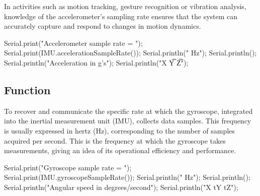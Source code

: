 In activities such as motion tracking, gesture recognition or vibration analysis, knowledge of the accelerometer's sampling rate ensures that the system can accurately capture and respond to changes in motion dynamics. 

\begin{Arduino}
	Serial.print("Accelerometer sample rate = ");
	Serial.print(IMU.accelerationSampleRate());
	Serial.println(" Hz");
	Serial.println();
	Serial.println("Acceleration in g's");
	Serial.println("X \t Y  \t Z");
\end{Arduino}



\subsection{Function }

To recover and communicate the specific rate at which the gyroscope, integrated into the inertial measurement unit (IMU), collects data samples. This frequency is usually expressed in hertz (Hz), corresponding to the number of samples acquired per second. This is the frequency at which the gyroscope takes measurements, giving an idea of its operational efficiency and performance. \cite{STMicroelectronics_LSM9DS1:2024}

\begin{Arduino}
	Serial.print("Gyroscope sample rate = ");
	Serial.print(IMU.gyroscopeSampleRate());
	Serial.println(" Hz");
	Serial.println();
	Serial.println("Angular speed in degrees/second");
	Serial.println("X tY tZ");
	
\end{Arduino}

